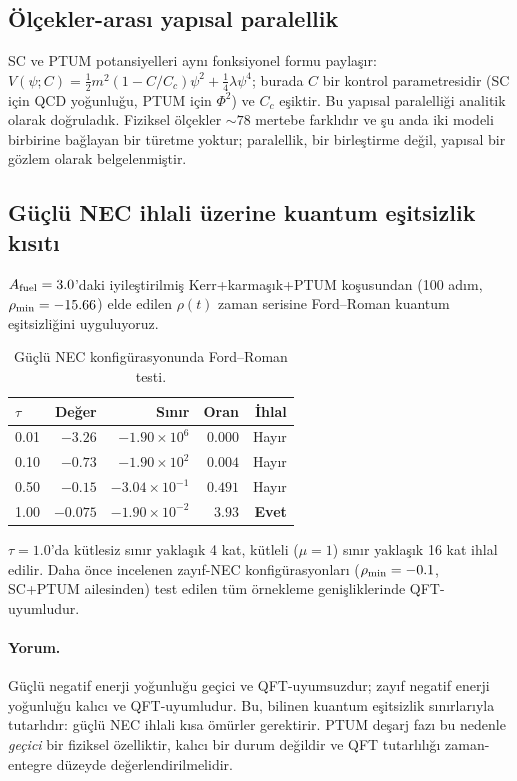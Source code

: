 \subsection{Ölçekler-arası yapısal paralellik}

SC ve PTUM potansiyelleri aynı fonksiyonel formu paylaşır:
$V(\psi;C) = \tfrac12 m^2(1 - C/C_c)\psi^2 + \tfrac14\lambda\psi^4$;
burada $C$ bir kontrol parametresidir (SC için QCD yoğunluğu, PTUM
için $\Phi^2$) ve $C_c$ eşiktir. Bu yapısal paralelliği analitik
olarak doğruladık. Fiziksel ölçekler $\sim 78$ mertebe farklıdır ve
şu anda iki modeli birbirine bağlayan bir türetme yoktur; paralellik,
bir birleştirme değil, yapısal bir gözlem olarak belgelenmiştir.


\subsection{Güçlü NEC ihlali üzerine kuantum eşitsizlik kısıtı}

$A_{\rm fuel} = 3.0$'daki iyileştirilmiş Kerr+karmaşık+PTUM
koşusundan (100 adım, $\rho_{\rm min} = -15.66$) elde edilen
$\rho(t)$ zaman serisine Ford--Roman kuantum eşitsizliğini
uyguluyoruz.

\begin{table}[h]
\centering
\footnotesize
\caption{Güçlü NEC konfigürasyonunda Ford--Roman testi.}
\label{tab:ford_roman_strong_tr}
\begin{tabular}{lrrrr}
\hline
$\tau$ & Değer & Sınır & Oran & İhlal \\
\hline
0.01 & $-3.26$ & $-1.90\times 10^{6}$ & $0.000$ & Hayır \\
0.10 & $-0.73$ & $-1.90\times 10^{2}$ & $0.004$ & Hayır \\
0.50 & $-0.15$ & $-3.04\times 10^{-1}$ & $0.491$ & Hayır \\
1.00 & $-0.075$ & $-1.90\times 10^{-2}$ & $3.93$ & \textbf{Evet} \\
\hline
\end{tabular}
\end{table}

$\tau = 1.0$'da kütlesiz sınır yaklaşık 4 kat, kütleli
($\mu = 1$) sınır yaklaşık 16 kat ihlal edilir. Daha önce
incelenen zayıf-NEC konfigürasyonları ($\rho_{\rm min} = -0.1$,
SC+PTUM ailesinden) test edilen tüm örnekleme genişliklerinde
QFT-uyumludur.

\paragraph{Yorum.}
Güçlü negatif enerji yoğunluğu geçici ve QFT-uyumsuzdur; zayıf
negatif enerji yoğunluğu kalıcı ve QFT-uyumludur. Bu, bilinen
kuantum eşitsizlik sınırlarıyla tutarlıdır: güçlü NEC ihlali kısa
ömürler gerektirir. PTUM deşarj fazı bu nedenle \emph{geçici}
bir fiziksel özelliktir, kalıcı bir durum değildir ve QFT
tutarlılığı zaman-entegre düzeyde değerlendirilmelidir.


